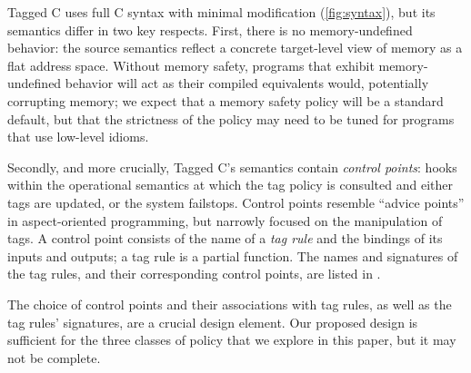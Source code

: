 \documentclass[acmsmall,review,anonymous]{acmart}\settopmatter{printfolios=true,printccs=false,printacmref=false}
\begin{document}
Tagged C uses full C syntax with minimal modification (\cref{fig:syntax}), but its semantics differ in
two key respects. First, there is no memory-undefined behavior: the source semantics reflect a
concrete target-level view of memory as a flat address space. Without memory safety, programs
that exhibit memory-undefined behavior will act as their compiled equivalents would, potentially
corrupting memory; we expect that a memory safety policy will be a standard default, but that the
strictness of the policy may need to be tuned for programs that use low-level idioms.

Secondly, and more crucially, Tagged C's semantics contain {\em control points}: hooks within the
operational semantics at which the tag policy is consulted and either tags are updated, or the system
failstops. Control points resemble ``advice points'' in aspect-oriented programming, but narrowly
focused on the manipulation of tags. A control point consists of the name of a {\em tag rule}
and the bindings of its inputs and outputs; a tag rule is a partial function. The names and
signatures of the tag rules, and their corresponding control points, are listed in .

The choice of control points and their associations with tag rules, as well as the tag rules'
signatures, are a crucial design element. Our proposed design is sufficient for the three classes of
policy that we explore in this paper, but it may not be complete.
\end{document}
